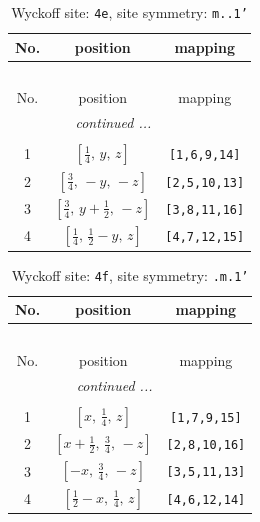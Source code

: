 \documentclass[fleqn,8pt]{jsarticle}
\begin{document}
\renewcommand{\arraystretch}{1.2}
\begin{longtable}{ccc}
\caption{Wyckoff site: {\tt 4e}, site symmetry: {\tt m..1'}}
 \\
 \hline \hline
No. & position & mapping \\ \hline \endfirsthead

\multicolumn{2}{l}{\tablename\ \thetable{}} \\
 \hline \hline
No. & position & mapping \\ \hline \endhead

 \hline \hline
\multicolumn{2}{r}{\footnotesize\it continued ...} \\ \endfoot

 \hline \hline
\multicolumn{2}{r}{} \\ \endlastfoot

1 & $\left[ \frac{1}{4},\, y,\, z \right]$ & {\tt [1,6,9,14]} \\ \hline
2 & $\left[ \frac{3}{4},\, - y,\, - z \right]$ & {\tt [2,5,10,13]} \\ \hline
3 & $\left[ \frac{3}{4},\, y + \frac{1}{2},\, - z \right]$ & {\tt [3,8,11,16]} \\ \hline
4 & $\left[ \frac{1}{4},\, \frac{1}{2} - y,\, z \right]$ & {\tt [4,7,12,15]} \\
\end{longtable}
\renewcommand{\arraystretch}{1.2}
\begin{longtable}{ccc}
\caption{Wyckoff site: {\tt 4f}, site symmetry: {\tt .m.1'}}
 \\
 \hline \hline
No. & position & mapping \\ \hline \endfirsthead

\multicolumn{2}{l}{\tablename\ \thetable{}} \\
 \hline \hline
No. & position & mapping \\ \hline \endhead

 \hline \hline
\multicolumn{2}{r}{\footnotesize\it continued ...} \\ \endfoot

 \hline \hline
\multicolumn{2}{r}{} \\ \endlastfoot

1 & $\left[ x,\, \frac{1}{4},\, z \right]$ & {\tt [1,7,9,15]} \\ \hline
2 & $\left[ x + \frac{1}{2},\, \frac{3}{4},\, - z \right]$ & {\tt [2,8,10,16]} \\ \hline
3 & $\left[ - x,\, \frac{3}{4},\, - z \right]$ & {\tt [3,5,11,13]} \\ \hline
4 & $\left[ \frac{1}{2} - x,\, \frac{1}{4},\, z \right]$ & {\tt [4,6,12,14]} \\
\end{longtable}
\end{document}
